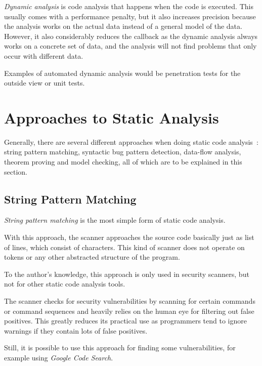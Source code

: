\emph{Dynamic analysis} is code analysis that happens when the code is executed. This usually comes with a performance penalty, but it also increases precision because the analysis works on the actual data instead of a general model of the data.~\cite{chess-west} However, it also considerably reduces the callback as the dynamic analysis always works on a concrete set of data, and the analysis will not find problems that only occur with different data.~\cite{static-code-analysis}

Examples of automated dynamic analysis would be penetration tests for the outside view or unit tests.



\section{Approaches to Static Analysis}
Generally, there are several different approaches when doing static code analysis~\cite{comparison-of-bug-finding-tools}: string pattern matching, syntactic bug pattern detection, data-flow analysis, theorem proving and model checking, all of which are to be explained in this section.


\subsection{String Pattern Matching}

\emph{String pattern matching} is the most simple form of static code analysis.

With this ap\-proach, the scanner approaches the source code basically just as list of lines, which consist of characters. This kind of scanner does not operate on tokens or any other abstracted structure of the program.

To the author's knowledge, this approach is only used in security scanners, but not for other static code analysis tools.

The scanner checks for security vulnerabilities by scanning for certain commands or command sequences and heavily relies on the human eye for filtering out false positives. This greatly reduces its practical use as programmers tend to ignore warnings if they contain lots of false positives.~\cite{understanding-value}

Still, it is possible to use this approach for finding some vulnerabilities, for example using \emph{Google Code Search}.~\cite{google-code-search}

